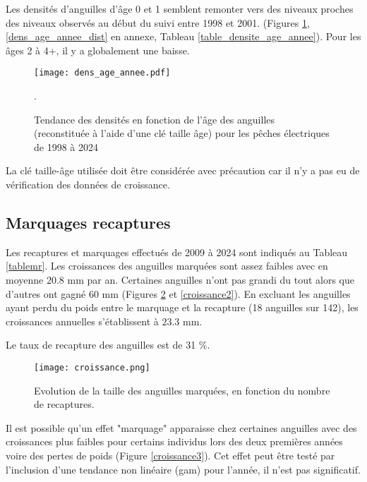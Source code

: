 \documentclass[10pt,twocolumn,titlepage,twoside]{article}\usepackage[]{graphicx}\usepackage[]{xcolor}
\begin{document}
    
\small

\normalsize

Les densités d'anguilles d'âge 0 et 1 semblent remonter vers des
niveaux proches des niveaux observés au début du suivi entre 1998 et 2001. 
 (Figures \ref{dens_age_annee},
\ref{dens_age_annee_dist} en annexe, Tableau \ref{table_densite_age_annee}).
Pour les âges 2 à 4+, il y a globalement une baisse.

\begin{figure}[htbp]
\centering
\texttt{[image: dens\_age\_annee.pdf]}
\caption[Densité par âge.]{Tendance des densités en fonction de
l'âge des anguilles (reconstituée à l'aide d'une clé taille âge) pour
les pêches électriques de 1998 à 2024 \footnotemark}.
\label{dens_age_annee}
\end{figure}


La clé taille-âge utilisée doit être considérée avec précaution car il n'y a pas eu de
vérification des données de croissance.
\subsection{Marquages recaptures}


Les recaptures et marquages effectués de 2009 à 2024 sont indiqués au Tableau
\ref{tablemr}.
Les croissances des anguilles marquées sont
assez faibles avec en moyenne $20.8$ mm par an. Certaines anguilles
n'ont pas grandi du tout alors que
d'autres ont gagné 60 mm (Figures \ref{croissance} et \ref{croissance2}). En
excluant les anguilles ayant perdu du poids entre le marquage et la recapture
(18 anguilles sur
142), les croissances annuelles s'établissent à
$23.3$ mm.

Le taux de recapture des anguilles est de
31 \%.

\begin{figure}[htbp]
\centering
\texttt{[image: croissance.png]}
\caption[Taille anguilles marquées]{Evolution de la taille des anguilles
marquées, en fonction du nombre de recaptures.}
\label{croissance}
\end{figure}
Il est possible qu'un effet "marquage" apparaisse chez certaines anguilles avec
des croissances plus faibles pour certains individus lors des deux premières
années voire des pertes de poids (Figure \ref{croissance3}). Cet effet peut
être testé par l'inclusion d'une tendance non linéaire (gam) pour l'année, il
n'est pas significatif.
\end{document}
